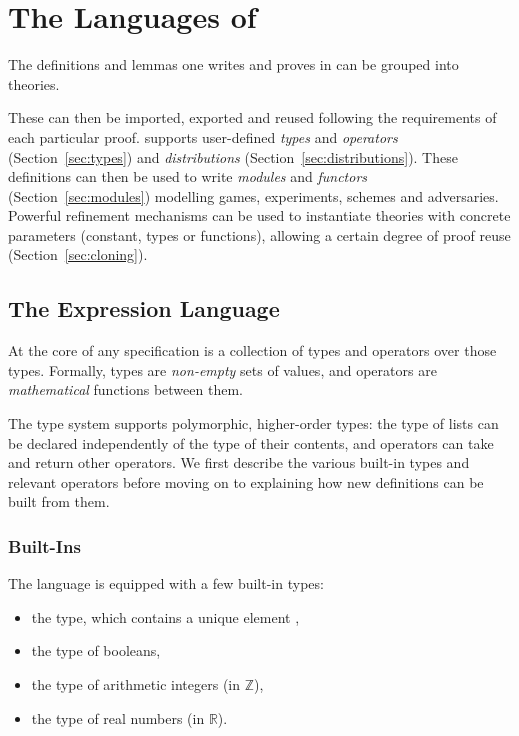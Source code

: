 
\chapter{The Languages of \EasyCrypt\label{chap:theories}}
The definitions and lemmas one writes and proves in \EasyCrypt can be grouped
into theories.

These can then be imported, exported and reused following the
requirements of each particular proof. \EasyCrypt supports user-defined
\emph{types} and \emph{operators} (Section~\ref{sec:types}) and
\emph{distributions} (Section~\ref{sec:distributions}). These definitions can
then be used to write \emph{modules} and \emph{functors}
(Section~\ref{sec:modules}) modelling games, experiments, schemes and
adversaries. Powerful refinement mechanisms can be used to instantiate theories
with concrete parameters (constant, types or functions), allowing a certain
degree of proof reuse (Section~\ref{sec:cloning}).


\section{The Expression Language\label{sec:types}}
At the core of any \EasyCrypt specification is a collection of types and operators
over those types. Formally, \EasyCrypt types are \emph{non-empty} sets of
values, and operators are \emph{mathematical} functions between them.

The \EasyCrypt type system supports polymorphic, higher-order types: the type of
lists can be declared independently of the type of their contents, and operators
can take and return other operators. We first describe the various built-in
types and relevant operators before moving on to explaining how new definitions
can be built from them.

\subsection{Built-Ins}
The language is equipped with a few built-in types:
\begin{itemize}\itemsep-.5em
\item the  type, which
        contains a unique element
        ,
\item the  type of booleans,
\item the  type of arithmetic integers (in $\mathbb{Z}$),
\item the  type of real numbers (in $\mathbb{R}$).
\end{itemize}

